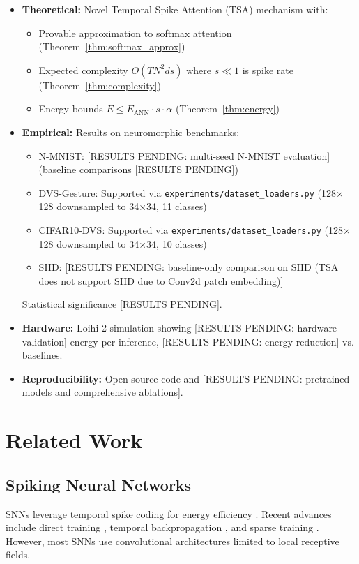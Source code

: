 \documentclass{article}
\begin{document}
\begin{itemize}
    \item \textbf{Theoretical:} Novel Temporal Spike Attention (TSA) mechanism with:
    \begin{itemize}
        \item Provable approximation to softmax attention (Theorem~\ref{thm:softmax_approx})
        \item Expected complexity $O(TN^2 d s)$ where $s \ll 1$ is spike rate (Theorem~\ref{thm:complexity})
        \item Energy bounds $E \leq E_{\text{ANN}} \cdot s \cdot \alpha$ (Theorem~\ref{thm:energy})
    \end{itemize}
    
    \item \textbf{Empirical:} Results on neuromorphic benchmarks:
    \begin{itemize}
        \item N-MNIST: [RESULTS PENDING: multi-seed N-MNIST evaluation] (baseline comparisons [RESULTS PENDING])
        \item DVS-Gesture: Supported via \texttt{experiments/dataset\_loaders.py} (128$\times$128 downsampled to 34$\times$34, 11 classes)
        \item CIFAR10-DVS: Supported via \texttt{experiments/dataset\_loaders.py} (128$\times$128 downsampled to 34$\times$34, 10 classes)
        \item SHD: [RESULTS PENDING: baseline-only comparison on SHD (TSA does not support SHD due to Conv2d patch embedding)]
    \end{itemize}
    Statistical significance [RESULTS PENDING].
    
    \item \textbf{Hardware:} Loihi 2 simulation showing [RESULTS PENDING: hardware validation] energy per inference, [RESULTS PENDING: energy reduction] vs. baselines.
    
    \item \textbf{Reproducibility:} Open-source code and [RESULTS PENDING: pretrained models and comprehensive ablations].
\end{itemize}

\section{Related Work}

\subsection{Spiking Neural Networks}
SNNs leverage temporal spike coding for energy efficiency \cite{maass1997networks}. Recent advances include direct training \cite{neftci2019surrogate}, temporal backpropagation \cite{shrestha2018slayer}, and sparse training \cite{rathi2022diet}. However, most SNNs use convolutional architectures limited to local receptive fields.
\end{document}
